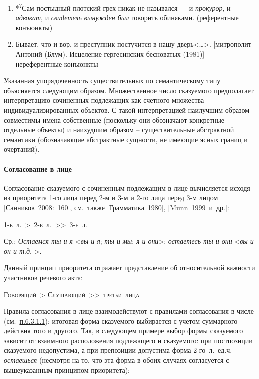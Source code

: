 \begin{enumerate}
\def\labelenumi{(\arabic{enumi})}
\setcounter{enumi}{120}
\item
  *\textsuperscript{?}Сам постыдный плотский грех никак не назывался ― и
  \emph{прокурор}, и \emph{адвокат}, и \emph{свидетель вынужден был}
  говорить обиняками. (референтные конъюнкты)
\item
  Бывает, что и вор, и преступник постучится в нашу
  дверь\textless\ldots\textgreater. {[}митрополит Антоний (Блум).
  Исцеление гергесинских бесноватых (1981){]} -- нереферентные конъюнкты
\end{enumerate}

Указанная упорядоченность существительных по семантическому типу
объясняется следующим образом. Множественное число сказуемого
предполагает интерпретацию сочиненных подлежащих как счетного множества
индивидуализированных объектов. С такой интерпретацией наилучшим образом
совместимы имена собственные (поскольку они обозначают конкретные
отдельные объекты) и наихудшим образом -- существительные абстрактной
семантики (обозначающие абстрактные сущности, не имеющие ясных границ и
очертаний).

\hypertarget{ux441ux43eux433ux43bux430ux441ux43eux432ux430ux43dux438ux435-ux432-ux43bux438ux446ux435}{%
\paragraph{Согласование в
лице}\label{ux441ux43eux433ux43bux430ux441ux43eux432ux430ux43dux438ux435-ux432-ux43bux438ux446ux435}}

Согласование сказуемого с сочиненным подлежащим в лице вычисляется
исходя из приоритета 1-го лица перед 2-м и 3-м и 2-го лица перед 3-м
лицом {[}Санников~2008:~160{]}, см.~также {[}Грамматика~1980{]},
{[}Munn~1999~и~др.{]}:

\textsc{1-е~л.~\textgreater~2-е~л.~\textgreater\textgreater~3-е~л.}

Ср.: \emph{Остаемся ты и я} \textless{}\emph{вы и я}; \emph{ты и мы};
\emph{я и они}\textgreater; \emph{остаетесь ты и они}
\textless{}\emph{вы и он и т}.\emph{д}. \textgreater.

Данный принцип приоритета отражает представление об относительной
важности участников речевого акта:

\textsc{Говорящий~\textgreater{}
Слушающий~\textgreater\textgreater~третьи~лица}

Правила согласования в лице взаимодействуют с правилами согласования в
числе (см.~\underline{п.6.3.1.1}): итоговая форма сказуемого выбирается
с учетом суммарного действия того и другого. Так, в следующем примере
выбор формы сказуемого зависит от взаимного расположения подлежащего и
сказуемого: при постпозиции сказуемого недопустима, а при препозиции
допустима форма 2-го~л.~ед.ч. \emph{остаешься} (несмотря на то, что эта
форма в обоих случаях согласуется с вышеуказанным принципом приоритета):

